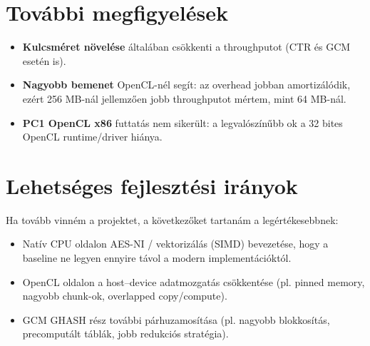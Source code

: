 \section{További megfigyelések}

\begin{itemize}
  \item \textbf{Kulcsméret növelése} általában csökkenti a throughputot (CTR és GCM esetén is).
  \item \textbf{Nagyobb bemenet} OpenCL-nél segít: az overhead jobban amortizálódik, ezért 256 MB-nál jellemzően jobb throughputot mértem, mint 64 MB-nál.
  \item \textbf{PC1 OpenCL x86} futtatás nem sikerült: a legvalószínűbb ok a 32 bites OpenCL runtime/driver hiánya.
\end{itemize}

\section{Lehetséges fejlesztési irányok}

Ha tovább vinném a projektet, a következőket tartanám a legértékesebbnek:

\begin{itemize}
  \item Natív CPU oldalon AES-NI / vektorizálás (SIMD) bevezetése, hogy a baseline ne legyen ennyire távol a modern implementációktól.
  \item OpenCL oldalon a host--device adatmozgatás csökkentése (pl. pinned memory, nagyobb chunk-ok, overlapped copy/compute).
  \item GCM GHASH rész további párhuzamosítása (pl. nagyobb blokkosítás, precomputált táblák, jobb redukciós stratégia).
\end{itemize}

\cleardoublepage
